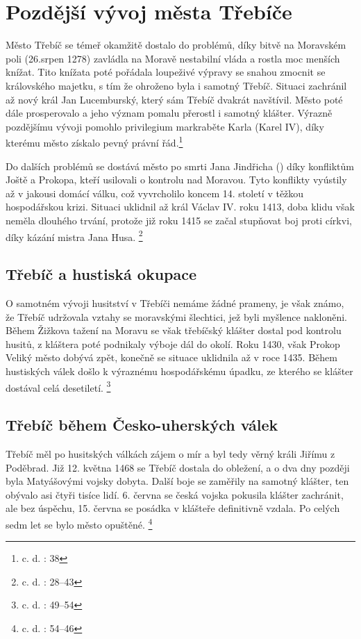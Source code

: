 \documentclass[a4paper,oneside,12p]{report}
\begin{document}
\chapter{Pozdější vývoj města Třebíče}

Město Třebíč se témeř okamžitě dostalo do problémů, díky bitvě na Moravském poli (26.srpen 1278) zavládla na Moravě nestabilní vláda a rostla moc menších knížat.
Tito knížata poté pořádala loupeživé výpravy se snahou zmocnit se královského majetku, s tím že ohroženo byla i samotný Třebíč. %
Situaci zachránil až nový král Jan Lucemburský, který sám Třebíč dvakrát navštívil.
Město poté dále prosperovalo a jeho význam pomalu přerostl i samotný klášter.
Výrazně pozdějšímu vývoji pomohlo privilegium markraběte Karla (Karel IV), díky kterému město získalo pevný právní řád.\footnote{c. d. : 38}

Do dalších problémů se dostává město po smrti Jana Jindřicha () díky konfliktům Joště a Prokopa, kteří usilovali o kontrolu nad Moravou.
Tyto konflikty vyústily až v jakousi domácí válku, což vyvrcholilo koncem 14. století v těžkou hospodářskou krizi.
Situaci uklidnil až král Václav IV. roku 1413, doba klidu však neměla dlouhého trvání, protože již roku 1415 se začal stupňovat boj proti církvi, díky kázání mistra Jana Husa. \footnote{c. d. : 28--43}

\section{Třebíč a hustiská okupace}

O samotném vývoji husitství v Třebíči nemáme žádné prameny, je však známo, že Třebíč udržovala vztahy se moravskými šlechtici, jež byli myšlence nakloněni.
Během Žižkova tažení na Moravu se však třebíčský klášter dostal pod kontrolu husitů, z kláštera poté podnikaly výboje dál do okolí.
Roku 1430, však Prokop Veliký město dobývá zpět, konečně se situace uklidnila až v roce 1435.
Během hustiských válek došlo k výraznému hospodářskému úpadku, ze kterého se klášter dostával celá desetiletí. \footnote{c. d. : 49--54}

\section{Třebíč během Česko-uherských válek}

Třebíč měl po husitských válkách zájem o mír a byl tedy věrný králi Jiřímu z Poděbrad.
Již 12. května 1468 se Třebíč dostala do obležení, a o dva dny později byla Matyášovými vojsky dobyta.
Další boje se zaměřily na samotný klášter, ten obývalo asi čtyři tisíce lidí.
6. června se česká vojska pokusila klášter zachránit, ale bez úspěchu, 15. června se posádka v klášteře definitivně vzdala.
Po celých sedm let se bylo město opuštěné. \footnote{c. d. : 54--46}
\end{document}

